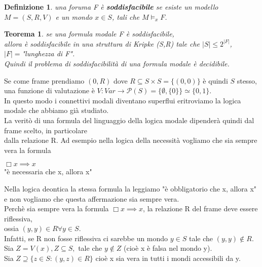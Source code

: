 \documentclass[a4paper,12pt]{article}
\theoremstyle{def}
\newtheorem*{definition}{Definizione}
\theoremstyle{prop}
\theoremstyle{esempio}
\theoremstyle{dimostrazione}
\theoremstyle{teo}
\newtheorem*{teorema}{Teorema}
\theoremstyle{osservazione}
\begin{document}
\begin{definition}
	una foruma F è \textbf{soddisfacibile} se esiste un modello\\
	\(M = (S, R, V)\) e un mondo \(x \in S\), tali che \(M \vDash_x F\).
\end{definition}
\begin{teorema}
	se una formula modale F è soddisfacibile,\\
	allora è soddisfacibile in una struttura di Kripke (S,R) tale che \(|S| \leq 2^{|F|}\),\\
	\(|F| = \)"lunghezza di F".\\
	Quindi il problema di soddisfacibilità di una formula modale è decidibile.\\
\end{teorema}

Se come frame prendiamo \(({0},R)\) dove \(R \subseteq S \times S = \{(0,0)\}\) è quindi \(S\) stesso,\\
una funzione di valutazione è \(V : Var \rightarrow \mathcal{P}(S) = \{\emptyset, \{0\}\} \simeq \{0,1\}\).\\
In questo modo i connettivi modali diventano superflui eritroviamo la logica modale che abbiamo già studiato.\\
La veritò di una formula del linguaggio della logica modale dipenderà quindi dal frame scelto, in particolare\\
dalla relazione R.
Ad esempio nella logica della necessità vogliamo che sia sempre vera la formula
\begin{center}
	\(\Box x \implies x\)\\
	"è necessaria che x, allora x"
\end{center}
Nella logica deontica la stessa formula la leggiamo "è obbligatorio che x, allora x"\\
e non vogliamo che questa affermazione sia sempre vera.\\
Perchè sia sempre vera la formula \(\Box x \implies x\), la relazione R del frame deve essere riflessiva,\\
ossia \((y,y) \in R \forall y \in S\).\\
Infatti, se R non fosse riflessiva ci sarebbe un mondo \(y \in S\) tale che \((y,y) \notin R\).\\
Sia \(Z = V(x), Z \subseteq S,\) tale che \(y \notin Z\) (cioè x è falsa nel mondo y).\\
Sia \(Z \supseteq \{z \in S : (y,z) \in R\}\) cioè x sia vera in tutti i mondi accessibili da y.\\
\end{document}
